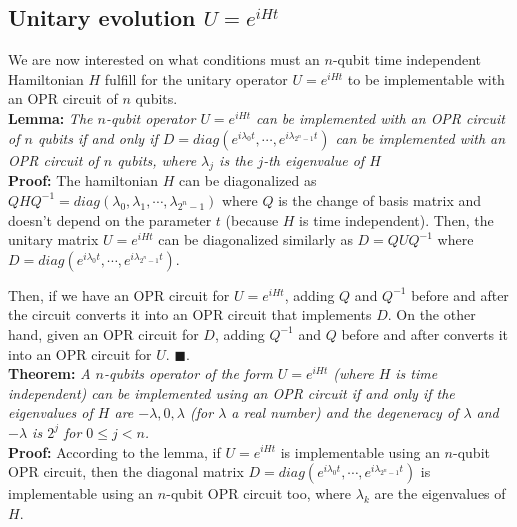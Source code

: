 \newpage
\subsection{Unitary evolution $U = e^{iHt}$}

We are now interested on what conditions must an $n$-qubit time independent Hamiltonian $H$
fulfill for the unitary operator $U = e^{iHt}$ to be
implementable with an OPR circuit of $n$ qubits. \\


\textbf{Lemma:} \textit{The $n$-qubit operator $U = e^{iHt}$ can be implemented with an OPR circuit of $n$ qubits
if and only if $D = diag(e^{i\lambda_0 t}, \cdots, e^{i\lambda_{2^n-1}t})$ can be implemented with an OPR circuit of $n$ qubits,
where $\lambda_j$ is the $j$-th eigenvalue of $H$}\\

\textbf{Proof:} The hamiltonian $H$ can be diagonalized as $QHQ^{-1} = diag(\lambda_0,\lambda_1, \cdots,\lambda_{2^n-1})$
 where $Q$ is the  change of  basis matrix and doesn't depend on the parameter $t$ 
 (because $H$ is time independent). Then, the unitary matrix $U = e^{iHt}$ can be diagonalized similarly as $D = QUQ^{-1}$ where $D = diag(e^{i\lambda_0 t}, \cdots, e^{i\lambda_{2^n-1}t})$.
 
Then, if we have an OPR circuit for $U = e^{iHt}$, adding $Q$ and $Q^{-1}$ before and after the circuit converts it into an OPR circuit that
implements $D$. On the other hand, given an OPR circuit for $D$, adding $Q^{-1}$ and $Q$ before and after
converts it into an OPR circuit for $U$. $\blacksquare$. \\


\textbf{Theorem:} \textit{A $n$-qubits operator of the form $U = e^{iHt}$ (where $H$ is time independent) can be implemented 
using an OPR circuit if and only if the eigenvalues of $H$
are $-\lambda, 0, \lambda$ (for $\lambda$ a real number) and the degeneracy of $\lambda$ and $-\lambda$ is $2^j$ for $0 \leq j < n$.} \\

\textbf{Proof:} According to the lemma, if $U = e^{iHt}$ is implementable using an $n$-qubit OPR circuit,
then the diagonal matrix $D = diag(e^{i\lambda_0 t}, \cdots, e^{i\lambda_{2^n-1}t})$ is implementable using an $n$-qubit OPR circuit too,
 where $\lambda_k$ are the eigenvalues of $H$. 

